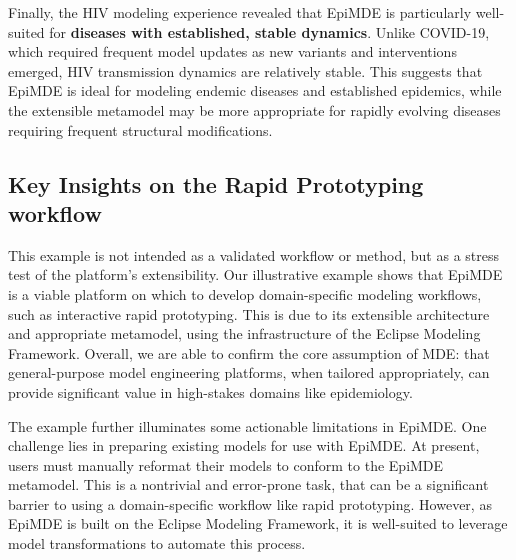 Finally, the HIV modeling experience revealed that EpiMDE is particularly well-suited for \textbf{diseases with established, stable dynamics}. Unlike COVID-19, which required frequent model updates as new variants and interventions emerged, HIV transmission dynamics are relatively stable. This suggests that EpiMDE is ideal for modeling endemic diseases and established epidemics, while the extensible metamodel may be more appropriate for rapidly evolving diseases requiring frequent structural modifications.

\subsection{Key Insights on the Rapid Prototyping workflow}
This example is not intended as a validated workflow or method, but as a stress test of the platform’s extensibility. Our illustrative example shows that EpiMDE is a viable platform on which to develop  domain-specific modeling workflows, such as interactive rapid prototyping.
This is due to its extensible architecture and appropriate metamodel, using the infrastructure of the Eclipse Modeling Framework. Overall, we are able to confirm the core assumption of MDE: that general-purpose model engineering platforms, when tailored appropriately, can provide significant value in high-stakes domains like epidemiology. 

The example further illuminates some actionable limitations in EpiMDE.
One challenge lies in preparing existing models for use with EpiMDE. 
At present, users must manually reformat their models to conform to the EpiMDE metamodel. 
This is a nontrivial and error-prone task, that can be a significant barrier to using a domain-specific workflow like rapid prototyping. 
However, as EpiMDE is built on the Eclipse Modeling Framework, 
it is well-suited to  leverage model transformations to automate this process. 


